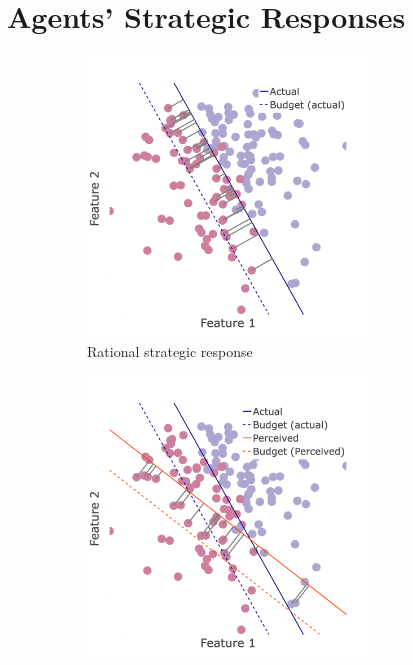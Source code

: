 \section{Agents' Strategic Responses}\label{sec:agetns-response}

\begin{figure}[t]
    \centering
    \begin{subfigure}[t]{0.3\textwidth}
        \includegraphics[width=0.82\textwidth]{Figures/NB_movement_arrows.png}
            \caption{Rational strategic response}
        \label{fig:NB-arrows}
    \end{subfigure}
    \begin{subfigure}[t]{0.3\textwidth}
        \includegraphics[width=0.82\textwidth]{Figures/B_movement_arrows.png}

\end{subfigure}
\end{figure}

